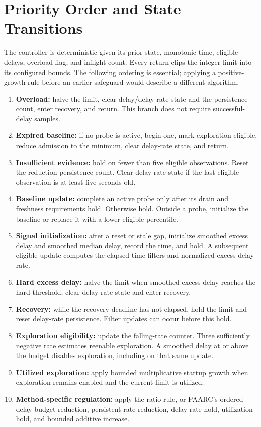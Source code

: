 \documentclass[10pt]{article}
\begin{document}
\section{Priority Order and State Transitions}
The controller is deterministic given its prior state, monotonic time, eligible delays, overload flag, and inflight count. Every return clips the integer limit into its configured bounds. The following ordering is essential; applying a positive-growth rule before an earlier safeguard would describe a different algorithm.
\begin{enumerate}
\item \textbf{Overload:} halve the limit, clear delay/delay-rate state and the persistence count, enter recovery, and return. This branch does not require successful-delay samples.
\item \textbf{Expired baseline:} if no probe is active, begin one, mark exploration eligible, reduce admission to the minimum, clear delay-rate state, and return.
\item \textbf{Insufficient evidence:} hold on fewer than five eligible observations. Reset the reduction-persistence count. Clear delay-rate state if the last eligible observation is at least five seconds old.
\item \textbf{Baseline update:} complete an active probe only after its drain and freshness requirements hold. Otherwise hold. Outside a probe, initialize the baseline or replace it with a lower eligible percentile.
\item \textbf{Signal initialization:} after a reset or stale gap, initialize smoothed excess delay and smoothed median delay, record the time, and hold. A subsequent eligible update computes the elapsed-time filters and normalized excess-delay rate.
\item \textbf{Hard excess delay:} halve the limit when smoothed excess delay reaches the hard threshold; clear delay-rate state and enter recovery.
\item \textbf{Recovery:} while the recovery deadline has not elapsed, hold the limit and reset delay-rate persistence. Filter updates can occur before this hold.
\item \textbf{Exploration eligibility:} update the falling-rate counter. Three sufficiently negative rate estimates reenable exploration. A smoothed delay at or above the budget disables exploration, including on that same update.
\item \textbf{Utilized exploration:} apply bounded multiplicative startup growth when exploration remains enabled and the current limit is utilized.
\item \textbf{Method-specific regulation:} apply the ratio rule, or PAARC's ordered delay-budget reduction, persistent-rate reduction, delay rate hold, utilization hold, and bounded additive increase.
\end{enumerate}
\end{document}
